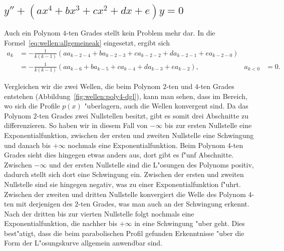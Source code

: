 \subsection{\texorpdfstring{$y''+(ax^4+bx^3+cx^2+dx+e)y = 
0$}{y''-(ax4+bx3+cx2+dx+e)y = 0}}

Auch ein Polynom $4$-ten Grades stellt kein Problem mehr dar. In die 
Formel~\eqref{eq:wellen:allgemeineak} eingesetzt, ergibt sich
\begin{align*}
		a_k &= -\frac{1}{k(k-1)} (aa_{k-2-4} + 
		ba_{k-2-3} + ca_{k-2-2} + da_{k-2-1} +ea_{k-2-0})
		\\
		&= -\frac{1}{k(k-1)} (aa_{k-6} + ba_{k-5} + 
		ca_{k-4} + da_{k-3} +ea_{k-2}), &a_{k<0} &= 0.
\end{align*}

Vergleichen wir die zwei Wellen, die beim Polynom $2$-ten und $4$-ten Grades 
entstehen (Abbildung~\ref{fig:wellen:poly4-dgl}), kann man sehen, 
dass im Bereich, wo sich die Profile $p(x)$ "uberlagern, auch die Wellen 
konvergent sind. Da das Polynom $2$-ten Grades zwei Nullstellen besitzt, gibt 
es somit drei Abschnitte zu differenzieren. So haben wir in diesem Fall von 
$-\infty$ bis zur ersten Nullstelle eine Exponentialfunktion, zwischen der 
ersten und zweiten Nullstelle eine Schwingung und danach bis $+\infty$ nochmals 
eine Exponentialfunktion. Beim Polynom $4$-ten Grades sieht dies hingegen etwas 
anders aus, dort gibt es f"unf Abschnitte. Zwischen $-\infty$ und der ersten 
Nullstelle sind die L"osungen des Polynoms positiv, dadurch stellt sich dort 
eine Schwingung ein. Zwischen der ersten und zweiten Nullstelle sind sie 
hingegen negativ, was zu einer Exponentialfunktion f"uhrt. Zwischen der zweiten 
und dritten Nullstelle konvergiert die Welle des Polynom $4$-ten mit derjenigen 
des $2$-ten Grades, was man auch an der Schwingung erkennt. Nach der dritten 
bis zur vierten Nullstelle folgt nochmals eine Exponentialfunktion, die nachher 
bis $+\infty$ in eine Schwingung "uber geht. Dies best"atigt, dass die beim 
parabolischen Profil gefunden Erkenntnisse "uber die Form der L"osungskurve 
allgemein anwendbar sind.

